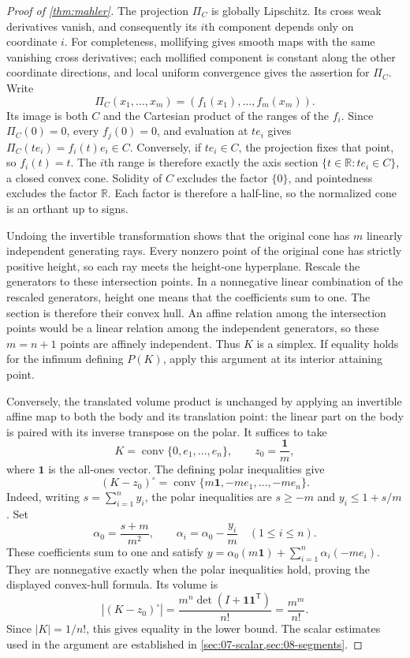 \begin{proof}[Proof of \cref{thm:mahler}]
The projection $\Pi_C$ is globally Lipschitz.  Its cross weak derivatives vanish, and consequently its $i$th component depends only on coordinate $i$.  For completeness, mollifying gives smooth maps with the same vanishing cross derivatives; each mollified component is constant along the other coordinate directions, and local uniform convergence gives the assertion for $\Pi_C$.  Write
\[
 \Pi_C(x_1,\ldots,x_m)=(f_1(x_1),\ldots,f_m(x_m)).
\]
Its image is both $C$ and the Cartesian product of the ranges of the $f_i$. Since $\Pi_C(0)=0$, every $f_j(0)=0$, and evaluation at $t e_i$ gives $\Pi_C(t e_i)=f_i(t)e_i\in C$. Conversely, if $t e_i\in C$, the projection fixes that point, so $f_i(t)=t$. The $i$th range is therefore exactly the axis section $\{t\in\mathbb{R}:t e_i\in C\}$, a closed convex cone. Solidity of $C$ excludes the factor $\{0\}$, and pointedness excludes the factor $\mathbb{R}$.  Each factor is therefore a half-line, so the normalized cone is an orthant up to signs.

Undoing the invertible transformation shows that the original cone has $m$ linearly independent generating rays.  Every nonzero point of the original cone has strictly positive height, so each ray meets the height-one hyperplane. Rescale the generators to these intersection points. In a nonnegative linear combination of the rescaled generators, height one means that the coefficients sum to one. The section is therefore their convex hull. An affine relation among the intersection points would be a linear relation among the independent generators, so these $m=n+1$ points are affinely independent. Thus $K$ is a simplex. If equality holds for the infimum defining $P(K)$, apply this argument at its interior attaining point.

Conversely, the translated volume product is unchanged by applying an invertible affine map to both the body and its translation point: the linear part on the body is paired with its inverse transpose on the polar. It suffices to take
\[
 K=\operatorname{conv}\{0,e_1,\ldots,e_n\},
 \qquad z_0=\frac{\mathbf1}{m},
\]
where $\mathbf1$ is the all-ones vector.  The defining polar inequalities give
\[
 (K-z_0)^\circ
   =\operatorname{conv}\{m\mathbf1,-m e_1,\ldots,-m e_n\}.
\]
Indeed, writing $s=\sum_{i=1}^n y_i$, the polar inequalities are $s\ge-m$ and $y_i\le1+s/m$. Set
\[
 \alpha_0=\frac{s+m}{m^2},\qquad
 \alpha_i=\alpha_0-\frac{y_i}{m}\quad(1\le i\le n).
\]
These coefficients sum to one and satisfy $y=\alpha_0(m\mathbf1)+\sum_{i=1}^n\alpha_i(-m e_i)$. They are nonnegative exactly when the polar inequalities hold, proving the displayed convex-hull formula. Its volume is
\[
 |(K-z_0)^\circ|
   =\frac{m^n\det(I+\mathbf1\mathbf1^{\mathsf T})}{n!}
   =\frac{m^m}{n!}.
\]
Since $|K|=1/n!$, this gives equality in the lower bound.  The scalar estimates used in the argument are established in \cref{sec:07-scalar,sec:08-segments}.
\end{proof}
